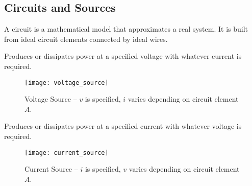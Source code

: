 \documentclass{article}
\begin{document}
\subsection{Circuits and Sources}
\begin{definition}[Circuits]
    A circuit is a mathematical model that approximates a real system. It is built from ideal circuit elements connected by ideal wires.
\end{definition}
\begin{definition}
    Produces or dissipates power at a specified voltage with whatever current is required.
\end{definition}
\begin{figure}[H]
    \centering
    \texttt{[image: voltage\_source]}
    \caption{Voltage Source -- $v$ is specified, $i$ varies depending on circuit element $A$.}
\end{figure}
\begin{definition}
    Produces or dissipates power at a specified current with whatever voltage is required.
\end{definition}
\begin{figure}[H]
    \centering
    \texttt{[image: current\_source]}
    \caption{Current Source -- $i$ is specified, $v$ varies depending on circuit element $A$.}
\end{figure}
\end{document}
